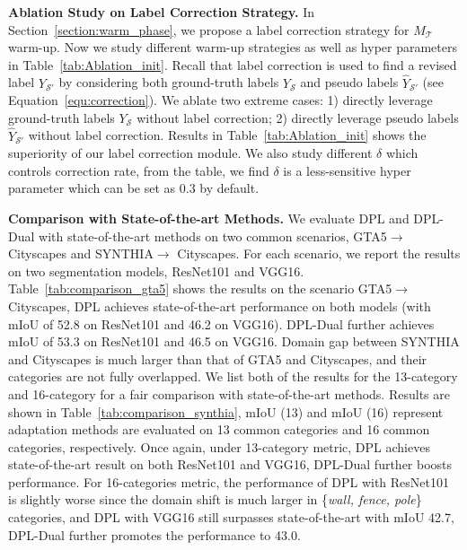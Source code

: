 \documentclass[10pt,twocolumn,letterpaper]{article}
\begin{document}
{\noindent \textbf{Ablation Study on Label Correction Strategy.}}\hspace{3pt}
In Section~\ref{section:warm_phase}, we propose a label correction strategy for $M_{\mathcal{T}}$ warm-up. Now we study different warm-up strategies as well as hyper parameters in Table~\ref{tab:Ablation_init}. Recall that label correction is used to find a revised label $Y_{\mathcal{S}'}$ by considering both ground-truth labels $Y_\mathcal{S}$ and pseudo labels $\hat{Y}_{\mathcal{S}'}$ (see Equation~\ref{equ:correction}). We ablate two extreme cases: 1) directly leverage ground-truth labels $Y_\mathcal{S}$ without label correction; 2) directly leverage pseudo labels $\hat{Y}_{\mathcal{S}'}$ without label correction. Results in Table~\ref{tab:Ablation_init} shows the superiority of our label correction module. We also study different $\delta$ which controls correction rate, from the table, we find $\delta$ is a less-sensitive hyper parameter which can be set as 0.3 by default.

{\noindent \textbf{Comparison with State-of-the-art Methods.}}\hspace{3pt}
\label{sec:experiments}
We evaluate DPL and DPL-Dual with state-of-the-art methods on two common scenarios, GTA5$\rightarrow$Cityscapes and SYNTHIA$\rightarrow$ Cityscapes. For each scenario, we report the results on two segmentation models, ResNet101 and VGG16. Table~\ref{tab:comparison_gta5} shows the results on the scenario GTA5$\rightarrow$Cityscapes, DPL achieves state-of-the-art performance on both models (with mIoU of 52.8 on ResNet101 and 46.2 on VGG16). DPL-Dual further achieves mIoU of 53.3 on ResNet101 and 46.5 on VGG16. Domain gap between SYNTHIA and Cityscapes is much larger than that of GTA5 and Cityscapes, and their categories are not fully overlapped. We list both of the results for the 13-category and 16-category for a fair comparison with state-of-the-art methods. Results are shown in Table~\ref{tab:comparison_synthia}, mIoU (13) and mIoU (16) represent adaptation methods are evaluated on 13 common categories and 16 common categories, respectively. Once again, under 13-category metric, DPL achieves state-of-the-art result on both ResNet101 and VGG16, DPL-Dual further boosts performance. For 16-categories metric, the performance of DPL with ResNet101 is slightly worse since the domain shift is much larger in \{\textit{wall, fence, pole}\} categories, and DPL with VGG16 still surpasses state-of-the-art with mIoU 42.7, DPL-Dual further promotes the performance to 43.0.
\end{document}
